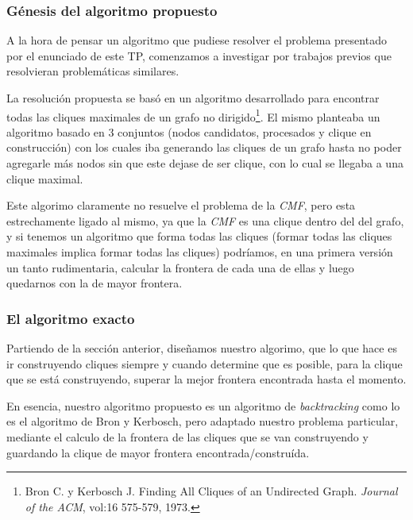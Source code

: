 \subsubsection{G\'enesis del algoritmo propuesto}
\par A la hora de pensar un algoritmo que pudiese resolver el problema presentado
    por el enunciado de este TP, comenzamos a investigar por trabajos previos que
    resolvieran problem\'aticas similares.

\par La resoluci\'on propuesta se bas\'o en un algoritmo desarrollado para encontrar
    todas las cliques maximales de un grafo no dirigido\footnote{%
    Bron C. y Kerbosch J. Finding All Cliques of an Undirected Graph. \emph{Journal
    of the ACM}, vol:16 575-579, 1973.}. El mismo planteaba un algoritmo basado en
    3 conjuntos (nodos candidatos, procesados y clique en construcci\'on) con los
    cuales iba generando las cliques de un grafo hasta no poder agregarle m\'as nodos
    sin que este dejase de ser clique, con lo cual se llegaba a una clique maximal.

\par Este algorimo claramente no resuelve el problema de la \emph{CMF}, pero esta
    estrechamente ligado al mismo, ya que la \emph{CMF} es una clique dentro del
    del grafo, y si tenemos un algoritmo que forma todas las cliques (formar todas
    las cliques maximales implica formar todas las cliques) podr\'iamos, en una
    primera versi\'on un tanto rudimentaria, calcular la frontera de cada una
    de ellas y luego quedarnos con la de mayor frontera.

\subsubsection{El algoritmo exacto}
\par Partiendo de la secci\'on anterior, dise\~namos nuestro algorimo, que lo que hace es
    ir construyendo cliques siempre y cuando determine que es posible, para la
    clique que se est\'a construyendo, superar la mejor frontera encontrada hasta
    el momento.

\par En esencia, nuestro algoritmo propuesto es un algoritmo de \emph{backtracking}
    como lo es el algoritmo de Bron y Kerbosch, pero adaptado nuestro problema
    particular, mediante el calculo de la frontera de las cliques que se van
    construyendo y guardando la clique de mayor frontera encontrada/constru\'ida.

